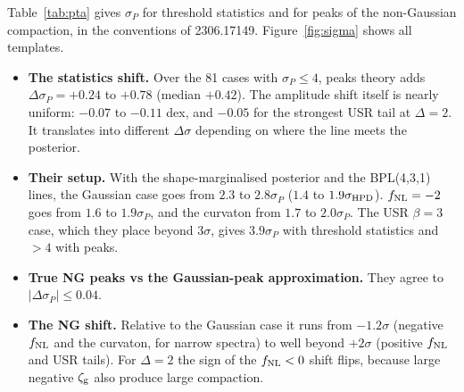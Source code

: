\documentclass[11pt,a4paper]{article}
\newcommand{\zg}{\zeta_{\rm g}}
\newcommand{\fnl}{f_{\rm NL}}
\begin{document}
Table~\ref{tab:pta} gives $\sigma_P$ for threshold statistics and for peaks of the non-Gaussian
compaction, in the conventions of 2306.17149. Figure~\ref{fig:sigma} shows all templates.
\begin{itemize}
\item \textbf{The statistics shift.} Over the 81 cases with $\sigma_P\le4$, peaks theory adds
$\Delta\sigma_P=+0.24$ to $+0.78$ (median $+0.42$). The amplitude shift itself is nearly uniform:
$-0.07$ to $-0.11$ dex, and $-0.05$ for the strongest USR tail at $\Delta=2$. It translates into
different $\Delta\sigma$ depending on where the line meets the posterior.
\item \textbf{Their setup.} With the shape-marginalised posterior and the BPL(4,3,1) lines, the
Gaussian case goes from $2.3$ to $2.8\sigma_P$ ($1.4$ to $1.9\sigma_{\rm HPD}$). $\fnl=-2$ goes from
$1.6$ to $1.9\sigma_P$, and the curvaton from $1.7$ to $2.0\sigma_P$. The USR $\beta=3$ case,
which they place beyond $3\sigma$, gives $3.9\sigma_P$ with threshold statistics and $>4$ with
peaks.
\item \textbf{True NG peaks vs the Gaussian-peak approximation.} They agree to $|\Delta\sigma_P|\le0.04$.
\item \textbf{The NG shift.} Relative to the Gaussian case it runs from $-1.2\sigma$ (negative
$\fnl$ and the curvaton, for narrow spectra) to well beyond $+2\sigma$ (positive $\fnl$ and USR
tails). For $\Delta=2$ the sign of the $\fnl<0$ shift flips, because large negative $\zg$ also
produce large compaction.
\end{itemize}
\end{document}
